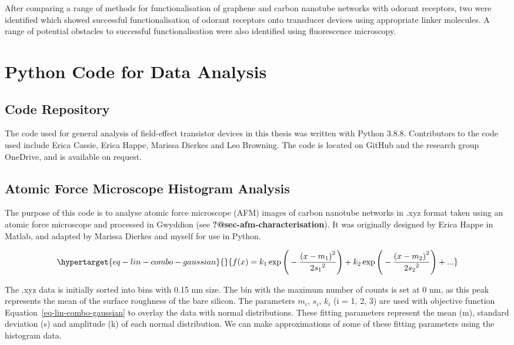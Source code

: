 \documentclass[
  a4paper,
]{scrbook}
\begin{document}
After comparing a range of methods for functionalisation of graphene and
carbon nanotube networks with odorant receptors, two were identified
which showed successful functionalisation of odorant receptors onto
transducer devices using appropriate linker molecules. A range of
potential obstacles to successful functionalisation were also identified
using fluorescence microscopy.

\cleardoublepage
{}
{}
\appendix

\hypertarget{sec-python}{%
\chapter{Python Code for Data Analysis}\label{sec-python}}

\hypertarget{code-repository}{%
\section{Code Repository}\label{code-repository}}

The code used for general analysis of field-effect transistor devices in
this thesis was written with Python 3.8.8. Contributors to the code used
include Erica Cassie, Erica Happe, Marissa Dierkes and Leo Browning. The
code is located on GitHub and the research group OneDrive, and is
available on request.

\hypertarget{sec-histogram-analysis}{%
\section{Atomic Force Microscope Histogram
Analysis}\label{sec-histogram-analysis}}

The purpose of this code is to analyse atomic force microscope (AFM)
images of carbon nanotube networks in .xyz format taken using an atomic
force microscope and processed in Gwyddion (see
\textbf{?@sec-afm-characterisation}). It was originally designed by
Erica Happe in Matlab, and adapted by Marissa Dierkes and myself for use
in Python.

\begin{equation}\protect\hypertarget{eq-lin-combo-gaussian}{}{
f(x) = k_1\exp{\Bigg(-\frac{{(x-m_1)}^{2}}{{2s_1}^{2}}\Bigg)} + k_2\exp{\Bigg(-\frac{{(x-m_2)}^{2}}{{2s_2}^{2}}\Bigg)} + ...
}\label{eq-lin-combo-gaussian}\end{equation}

The .xyz data is initially sorted into bins with 0.15 nm size. The bin
with the maximum number of counts is set at 0 nm, as this peak
represents the mean of the surface roughness of the bare silicon. The
parameters \(m_i\), \(s_i\), \(k_i\) (i = 1, 2, 3) are used with
objective function Equation~\ref{eq-lin-combo-gaussian} to overlay the
data with normal distributions. These fitting parameters represent the
mean (m), standard deviation (s) and amplitude (k) of each normal
distribution. We can make approximations of some of these fitting
parameters using the histogram data.
\end{document}
